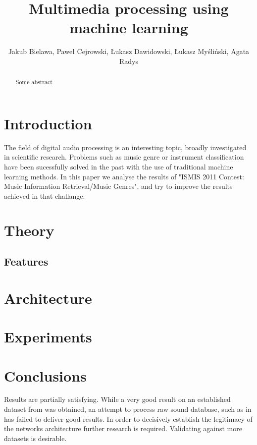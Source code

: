 \documentclass[journal, a4paper]{IEEEtran}
\begin{document}
	\title{Multimedia processing using machine learning}
	\author{Jakub Bielawa, Paweł Cejrowski, Łukasz Dawidowski, Łukasz Myśliński, Agata Radys}
	\maketitle

\begin{abstract}
Some abstract
\end{abstract}

\section{Introduction}
The field of digital audio processing is an interesting topic, broadly investigated in scientific research. Problems such as music genre or instrument classification have been sucessfully solved in the past with the use of traditional machine learning methods. In this paper we analyse the results of "ISMIS 2011 Contest: Music Information Retrieval/Music Genres", and try to improve the results achieved in that challange. 
\section{Theory}


\subsection{Features}



\section{Architecture}


	
\section{Experiments}



\section{Conclusions}

Results are partially satisfying. While a very good result on an established dataset from \cite{data} was obtained, an attempt to process raw sound database, such as in \cite{gztan} has failed to deliver good results. In order to decisively establish the legitimacy of the networks architecture further research is required. Validating against more datasets is desirable.

{}

\end{document}
